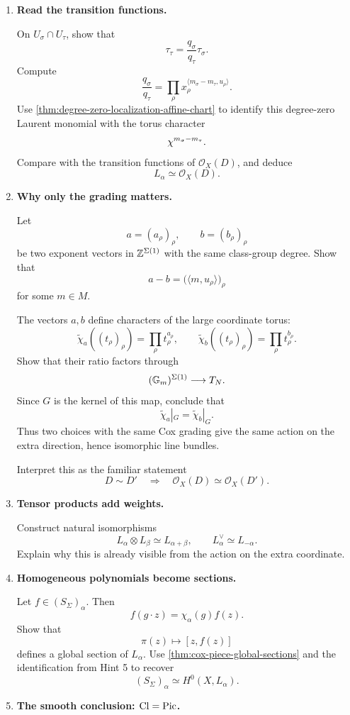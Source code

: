 \begin{enumerate}[label=\textbf{Hint \arabic*.},wide=0pt]
\item \textbf{Read the transition functions.}

On \(U_\sigma\cap U_\tau\), show that
\[
\tau_\tau
=
\frac{q_\sigma}{q_\tau}\tau_\sigma.
\]
Compute
\[
\frac{q_\sigma}{q_\tau}
=
\prod_\rho
x_\rho^{\langle m_\sigma-m_\tau,u_\rho\rangle}.
\]
Use \cref{thm:degree-zero-localization-affine-chart} to identify this
degree-zero Laurent monomial with the torus character
\[
\chi^{m_\sigma-m_\tau}.
\]
Compare with the transition functions of \(\mathcal O_X(D)\), and
deduce
\[
\boxed{L_\alpha\simeq\mathcal O_X(D).}
\]

\item \textbf{Why only the grading matters.}

Let
\[
a=(a_\rho)_\rho,
\qquad
b=(b_\rho)_\rho
\]
be two exponent vectors in \(\mathbb{Z}^{\Sigma(1)}\) with the same
class-group degree. Show that
\[
a-b
=
\bigl(\langle m,u_\rho\rangle\bigr)_\rho
\]
for some \(m\in M\).

The vectors \(a,b\) define characters of the large coordinate torus:
\[
\widetilde\chi_a((t_\rho)_\rho)
=
\prod_\rho t_\rho^{a_\rho},
\qquad
\widetilde\chi_b((t_\rho)_\rho)
=
\prod_\rho t_\rho^{b_\rho}.
\]
Show that their ratio factors through
\[
(\mathbb{G}_{m})^{\Sigma(1)}\longrightarrow T_N.
\]
Since \(G\) is the kernel of this map, conclude that
\[
\widetilde\chi_a|_G
=
\widetilde\chi_b|_G.
\]
Thus two choices with the same Cox grading give the same action on the
extra direction, hence isomorphic line bundles.

Interpret this as the familiar statement
\[
D\sim D'
\quad\Longrightarrow\quad
\mathcal O_X(D)\simeq\mathcal O_X(D').
\]

\item \textbf{Tensor products add weights.}

Construct natural isomorphisms
\[
L_\alpha\otimes L_\beta
\simeq
L_{\alpha+\beta},
\qquad
L_\alpha^\vee
\simeq
L_{-\alpha}.
\]
Explain why this is already visible from the action on the extra
coordinate.

\item \textbf{Homogeneous polynomials become sections.}

Let \(f\in(S_\Sigma)_\alpha\). Then
\[
f(g\cdot z)=\chi_\alpha(g)f(z).
\]
Show that
\[
\pi(z)
\longmapsto
[z,f(z)]
\]
defines a global section of \(L_\alpha\). Use
\cref{thm:cox-piece-global-sections} and the identification from Hint
5 to recover
\[
(S_\Sigma)_\alpha
\simeq
H^0(X,L_\alpha).
\]

\item \textbf{The smooth conclusion: \(\operatorname{Cl}=\operatorname{Pic}\).}


\end{enumerate}
